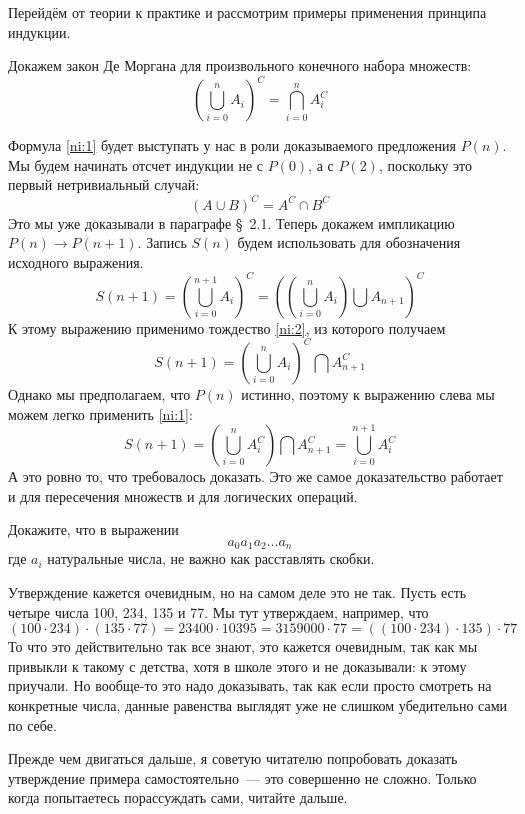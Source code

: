 Перейдём от теории к практике и рассмотрим примеры применения принципа индукции.

\begin{example}
Докажем закон Де Моргана для произвольного конечного набора множеств:
\begin{equation}\label{ni:1}
\left(\bigcup_{i=0}^n A_i\right)^C = \bigcap_{i=0}^n A_i^C
\end{equation}
\end{example}

Формула \eqref{ni:1} будет выступать у нас в роли доказываемого предложения $P(n)$. Мы будем начинать отсчет индукции не с $P(0)$, а с $P(2)$, поскольку это первый нетривиальный случай:
\begin{equation}\label{ni:2}
(A\cup B)^C = A^C \cap B^C
\end{equation}
Это мы уже доказывали в параграфе \S~2.1. Теперь докажем импликацию $P(n)\to P(n + 1)$. Запись $S(n)$ будем использовать для обозначения исходного выражения.
$$S(n+1) = \left( \bigcup_{i=0}^{n+1} A_i \right)^C = \left( \left( \bigcup_{i=0}^n A_i\right) \bigcup A_{n+1}\right)^C$$
К этому выражению применимо тождество \eqref{ni:2}, из которого получаем
$$S(n+1) = \left( \bigcup_{i=0}^n A_i\right)^C \bigcap A_{n+1}^C$$
Однако мы предполагаем, что $P(n)$ истинно, поэтому к выражению слева мы можем легко применить \eqref{ni:1}:
$$S(n+1) = \left(\bigcup_{i=0}^n A_i^C\right) \bigcap A_{n+1}^C = \bigcup_{i=0}^{n+1} A_i^C$$
А это ровно то, что требовалось доказать. Это же самое доказательство работает и для пересечения множеств и для логических операций.

\begin{example}
Докажите, что в выражении
$$a_0 a_1 a_2 \ldots a_n$$
где $a_i$ натуральные числа, не важно как расставлять скобки.
\end{example}

Утверждение кажется очевидным, но на самом деле это не так. Пусть есть четыре числа 100, 234, 135 и 77. Мы тут утверждаем, например, что
$$(100\cdot 234)\cdot (135 \cdot77) = 23400 \cdot 10395 = 3159000 \cdot 77 = ((100\cdot 234)\cdot 135) \cdot77$$
То что это действительно так все знают, это кажется очевидным, так как мы привыкли к такому с детства, хотя в школе этого и не доказывали: к этому приучали. Но вообще-то это надо доказывать, так как если просто смотреть на конкретные числа, данные равенства выглядят уже не слишком убедительно сами по себе.

Прежде чем двигаться дальше, я советую читателю попробовать доказать утверждение примера самостоятельно~--- это совершенно не сложно. Только когда попытаетесь порассуждать сами, читайте дальше.

